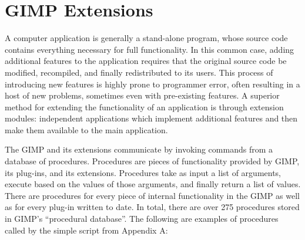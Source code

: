 \documentclass{article}
\begin{document}
\section{GIMP Extensions}

A computer application is generally a stand-alone program, whose
source code contains everything necessary for full functionality.  In
this common case, adding additional features to the application
requires that the original source code be modified, recompiled, and
finally redistributed to its users.  This process of introducing new
features is highly prone to programmer error, often resulting in a
host of new problems, sometimes even with pre-existing features.  A
superior method for extending the functionality of an application is
through extension modules: independent applications which implement
additional features and then make them available to the main
application.

The GIMP and its extensions communicate by invoking commands from a
database of procedures.  Procedures are pieces of functionality
provided by GIMP, its plug-ins, and its extensions.  Procedures take
as input a list of arguments, execute based on the values of those
arguments, and finally return a list of values.  There are procedures
for every piece of internal functionality in the GIMP as well as for
every plug-in written to date.  In total, there are over 275
procedures stored in GIMP's ``procedural database''.  The following are
examples of procedures called by the simple script from Appendix A:
\end{document}
